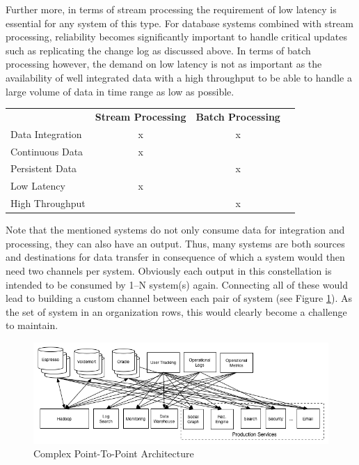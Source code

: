 Further more, in terms of stream processing the requirement of low latency is
essential for any system of this type. For database systems combined with stream
processing, reliability becomes significantly important to handle critical updates 
such as replicating the change log as discussed above.
In terms of batch processing however, the demand on low latency is not as
important as the availability of well integrated data with a high throughput to
be able to handle a large volume of data in time range as low as possible.

\begin{table}[H]
\centering
\begin{tabular}{l|c|cl}
\multicolumn{1}{c|}{\textbf{}} & \textbf{Stream Processing} & \textbf{Batch
Processing} & \multicolumn{1}{c}{\textbf{}} \\ \cline{1-3}
Data Integration               & x                          & x
&                               \\
Continuous Data                & x                          &
&                               \\
Persistent Data                &                            & x
&                               \\
Low Latency                    & x                          &
&                               \\
High Throughput                     &                            & x
&
\end{tabular}
\end{table}

Note that the mentioned systems do not only consume data for integration and
processing, they can also have an output. Thus, many systems are both sources and
destinations for data transfer in consequence of which a system would then need
two channels  per system. 
Obviously each output in this constellation is intended to be consumed by 1--N
system(s) again. Connecting all of these would lead to building a custom
channel between each pair of system (see Figure \ref{fig:datapipeline_complex}). As the set of system in an organization
rows, this would clearly become a challenge to maintain.

\begin{figure}[H]
    \centering
    \includegraphics[width=1.0\textwidth]{images/datapipeline_complex.png}
    \caption{Complex Point-To-Point Architecture}
    \label{fig:datapipeline_complex}
\end{figure}

